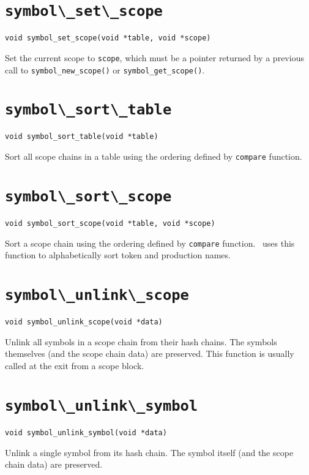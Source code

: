 \section{\protect\verb+symbol\_set\_scope+}
\begin{verbatim}
void symbol_set_scope(void *table, void *scope)
\end{verbatim}
Set the current scope to {\tt scope}, which must be a pointer returned
by a previous call to \verb+symbol_new_scope()+ or \verb+symbol_get_scope()+.

\section{\protect\verb+symbol\_sort\_table+}
\begin{verbatim}
void symbol_sort_table(void *table)
\end{verbatim}
Sort all scope chains in a table using the ordering defined by {\tt compare} function.

\section{\protect\verb+symbol\_sort\_scope+}
\begin{verbatim}
void symbol_sort_scope(void *table, void *scope)
\end{verbatim}
Sort a scope chain using the ordering defined by {\tt compare} function.
\rdp\ uses this function to alphabetically sort token and production
names.

\section{\protect\verb+symbol\_unlink\_scope+}
\begin{verbatim}
void symbol_unlink_scope(void *data) 
\end{verbatim}
Unlink all symbols in a scope chain from their hash chains. 
The symbols themselves (and the scope chain data) are
preserved. This function is usually called at the exit from a scope block.

\section{\protect\verb+symbol\_unlink\_symbol+}
\begin{verbatim}
void symbol_unlink_symbol(void *data)
\end{verbatim}
Unlink a single symbol from its hash chain. 
The symbol itself (and the scope chain data) are
preserved. 
